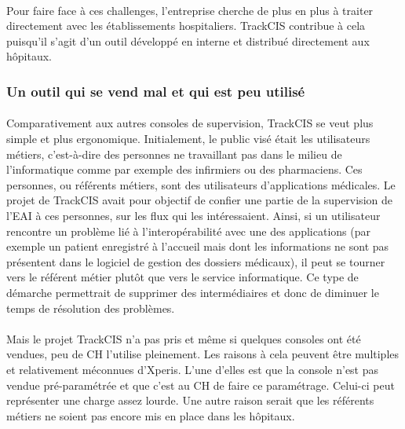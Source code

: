 			\paragraph{}%
			Pour faire face à ces challenges, l'entreprise cherche de plus 
			en plus à traiter directement avec les établissements hospitaliers. TrackCIS
			contribue à cela puisqu'il s'agit d'un outil développé en interne et
			distribué directement aux hôpitaux.
			
		\subsubsection{Un outil qui se vend mal et qui est peu utilisé}
			\paragraph{}%
			Comparativement aux autres consoles de supervision, TrackCIS se veut plus
			simple et plus ergonomique. Initialement, le public visé était les
			utilisateurs métiers, c'est-à-dire des personnes ne travaillant pas dans le
			milieu de l'informatique comme par exemple des infirmiers ou des pharmaciens.
			Ces personnes, ou référents métiers, sont des utilisateurs d'applications
			médicales. Le projet de TrackCIS avait pour objectif de confier une partie de
			la supervision de l'EAI à ces personnes, sur les flux qui les intéressaient.
			Ainsi, si un utilisateur rencontre un problème lié à l'interopérabilité avec
			une des applications (par exemple un patient enregistré à l'accueil mais dont
			les informations ne sont pas présentent dans le logiciel de gestion des
			dossiers médicaux), il peut se tourner vers le référent métier plutôt que
			vers le service informatique. Ce type de démarche permettrait de supprimer
			des intermédiaires et donc de diminuer le temps de résolution des problèmes.
			
			\paragraph{}%
			Mais le projet TrackCIS n'a pas pris et même si quelques consoles ont été
			vendues, peu de CH l'utilise pleinement. Les raisons à cela peuvent être
			multiples et relativement méconnues d'Xperis. L'une d'elles est que la
			console n'est pas vendue pré-paramétrée et que c'est au CH de faire ce
			paramétrage.
			Celui-ci peut représenter une charge assez lourde. Une autre raison serait
			que les référents métiers ne soient pas encore mis en place dans les
			hôpitaux.
			
